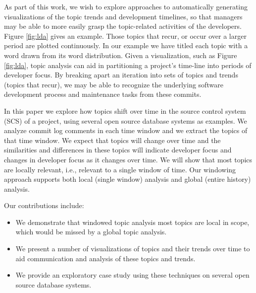\documentclass[times, 10pt,twocolumn]{article}
\begin{document}


As part of this work, we wish to explore approaches to automatically
generating visualizations of the topic trends and development timelines, so
that managers may be able to more easily grasp the topic-related
activities of the developers.  Figure \ref{fig:lda} gives an example.
Those topics that
recur, or occur over a larger period are plotted continuously. In our
example we have titled each topic with a word drawn from its
word distribution.  
Given a visualization, such as Figure \ref{fig:lda}, topic
analysis can aid in partitioning a project's time-line into periods of
developer focus.
By breaking apart an iteration into sets of topics
and trends (topics that recur), we may be able to recognize the
underlying software development process and maintenance tasks from these
commits. 




In this paper we explore how topics shift over time in the source
control system (SCS) of a project, using several open source database
systems as examples. We analyze commit log comments in each time
window and we extract the topics of that time window. We expect that
topics will change over time and the similarities and differences in
these topics will indicate developer focus and changes in developer
focus as it changes over time. We will show that most topics are
locally relevant, i.e., relevant to a single window of time.  
Our windowing approach supports both local (single window) analysis
and global (entire history) analysis.


Our contributions include:
\begin{itemize}
\item We demonstrate that windowed topic analysis most topics are local
  in scope, which would be missed by a global topic analysis.
\item We present a number of visualizations of topics and their trends over time to aid
  communication and analysis of these topics and trends.
\item We provide an exploratory case study using these techniques on
  several open source database systems.
\end{itemize}
\end{document}
